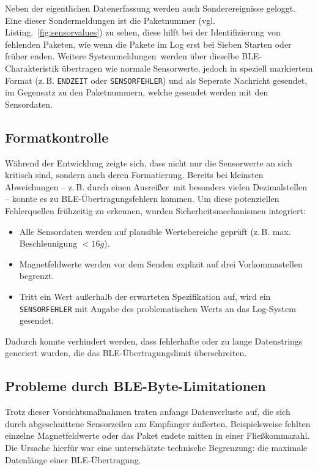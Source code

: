 Neben der eigentlichen Datenerfassung werden auch Sonderereignisse geloggt. Eine dieser Sondermeldungen ist die Paketnummer (vgl. Listing.~\ref{fig:sensorvalues}) zu sehen, diese hilft bei der Identifizierung von fehlenden Paketen, wie wenn die Pakete im Log erst bei Sieben Starten oder früher enden. Weitere \dq Systemmeldungen\dq\, werden über dieselbe BLE-Charakteristik übertragen wie normale Sensorwerte, jedoch in speziell markiertem Format (z.\,B. \texttt{ENDZEIT} oder \texttt{SENSORFEHLER}) und als Seperate Nachricht gesendet, im Gegensatz zu den Paketnummern, welche gesendet werden mit den Sensordaten.

\subsection{Formatkontrolle}

Während der Entwicklung zeigte sich, dass nicht nur die Sensorwerte an sich kritisch sind, sondern auch deren Formatierung. Bereits bei kleinsten Abweichungen – z.\,B. durch einen \dq Ausreißer\dq\, mit besonders vielen Dezimalstellen – konnte es zu BLE-Übertragungsfehlern kommen. Um diese potenziellen Fehlerquellen frühzeitig zu erkennen, wurden Sicherheitsmechanismen integriert:

\begin{itemize}
	\item Alle Sensordaten werden auf plausible Wertebereiche geprüft (z.\,B. max. Beschleunigung $< 16g$).
	\item Magnetfeldwerte werden vor dem Senden explizit auf drei Vorkommastellen begrenzt.
	\item Tritt ein Wert außerhalb der erwarteten Spezifikation auf, wird ein \texttt{SENSORFEHLER} mit Angabe des problematischen Werts an das Log-System gesendet.
\end{itemize}

Dadurch konnte verhindert werden, dass fehlerhafte oder zu lange Datenstrings generiert wurden, die das BLE-Übertragungslimit überschreiten.

\subsection{Probleme durch BLE-Byte-Limitationen}

Trotz dieser Vorsichtsmaßnahmen traten anfangs Datenverluste auf, die sich durch abgeschnittene Sensorzeilen am Empfänger äußerten. Beispielsweise fehlten einzelne Magnetfeldwerte oder das Paket endete mitten in einer Fließkommazahl. Die Ursache hierfür war eine unterschätzte technische Begrenzung: die maximale Datenlänge einer BLE-Übertragung.

